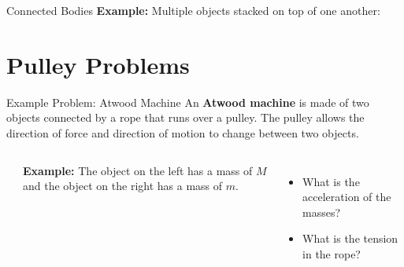 \documentclass[12pt,compress,aspectratio=169]{beamer}
\begin{document}
\begin{frame}{Connected Bodies}
  \textbf{Example:} Multiple objects stacked on top of one another:
  \begin{center}
  \end{center}
\end{frame}


\section{Pulley Problems}

\begin{frame}{Example Problem: Atwood Machine}
  An \textbf{Atwood machine} is made of two objects connected by a rope that
  runs over a pulley. The pulley allows the direction of force and direction
  of motion to change between two objects.
  \begin{columns}
    \begin{center}
    \end{center}
    \textbf{Example:} The object on the left has a mass of $M$ and the object
    on the right has a mass of $m$.
    \begin{itemize}
    \item What is the acceleration of the masses?
    \item What is the tension in the rope?
    \end{itemize}
  \end{columns}
\end{frame}
\end{document}
